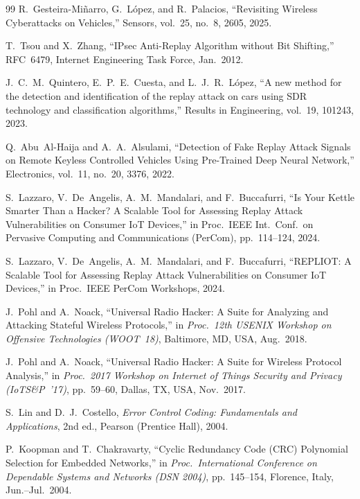 \documentclass[twocolumn,10pt,a4paper]{jsarticle}
\begin{document}
\begin{thebibliography}{99}
R.~Gesteira-Miñarro, G.~López, and R.~Palacios,
``Revisiting Wireless Cyberattacks on Vehicles,''
Sensors, vol.~25, no.~8, 2605, 2025.

T.~Tsou and X.~Zhang,
``IPsec Anti-Replay Algorithm without Bit Shifting,''
RFC~6479, Internet Engineering Task Force, Jan.\ 2012.

J.~C.~M.~Quintero, E.~P.~E.~Cuesta, and L.~J.~R.~López,
``A new method for the detection and identification of the replay attack on cars using SDR technology and classification algorithms,''
Results in Engineering, vol.~19, 101243, 2023.

Q.~Abu~Al-Haija and A.~A.~Alsulami,
``Detection of Fake Replay Attack Signals on Remote Keyless Controlled Vehicles Using Pre-Trained Deep Neural Network,''
Electronics, vol.~11, no.~20, 3376, 2022.

S.~Lazzaro, V.~De~Angelis, A.~M.~Mandalari, and F.~Buccafurri,
``Is Your Kettle Smarter Than a Hacker? A Scalable Tool for Assessing Replay Attack Vulnerabilities on Consumer IoT Devices,''
in Proc.\ IEEE Int.\ Conf.\ on Pervasive Computing and Communications (PerCom), pp.~114--124, 2024.

S.~Lazzaro, V.~De~Angelis, A.~M.~Mandalari, and F.~Buccafurri,
``REPLIOT: A Scalable Tool for Assessing Replay Attack Vulnerabilities on Consumer IoT Devices,''
in Proc.\ IEEE PerCom Workshops, 2024.

J.~Pohl and A.~Noack,
``Universal Radio Hacker: A Suite for Analyzing and Attacking Stateful Wireless Protocols,''
in \textit{Proc.\ 12th USENIX Workshop on Offensive Technologies (WOOT~18)},
Baltimore, MD, USA, Aug.\ 2018.

J.~Pohl and A.~Noack,
``Universal Radio Hacker: A Suite for Wireless Protocol Analysis,''
in \textit{Proc.\ 2017 Workshop on Internet of Things Security and Privacy (IoTS\&P~'17)},
pp.~59--60, Dallas, TX, USA, Nov.\ 2017.

S.~Lin and D.~J.~Costello,
\textit{Error Control Coding: Fundamentals and Applications},
2nd ed., Pearson (Prentice Hall), 2004.

P.~Koopman and T.~Chakravarty,
``Cyclic Redundancy Code (CRC) Polynomial Selection for Embedded Networks,''
in \textit{Proc.\ International Conference on Dependable Systems and Networks (DSN 2004)},
pp.~145--154, Florence, Italy, Jun.--Jul.\ 2004.


\end{thebibliography}
\end{document}
